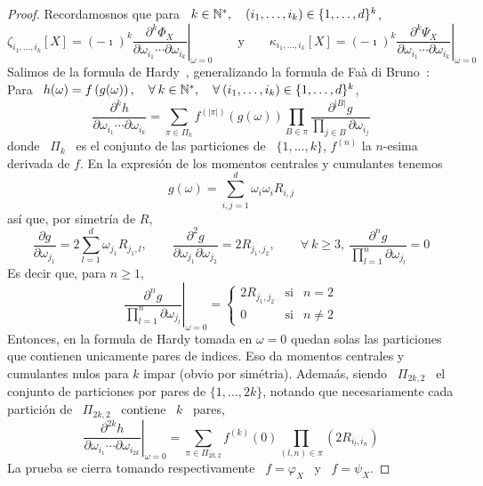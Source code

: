 \begin{proof}
  Recordamosnos que para \ $k \in \mathbb{N}^*, \quad (i_1 , \ldots , i_k) \in \{ 1 ,
  \ldots , d \}^k$,
  \[
  \zeta_{i_1,\ldots,i_k}[X]     =     (-    \imath)^k     \left.\frac{\partial^k
      \Phi_X}{\partial          \omega_{i_1}          \cdots          \partial
      \omega_{i_k}}\right|_{\omega=0}       \qquad       \mbox{y}       \qquad
  \kappa_{i_1,\ldots,i_k}[X]     =    (-     \imath)^k    \left.\frac{\partial^k
      \Psi_X}{\partial          \omega_{i_1}          \cdots          \partial
      \omega_{i_k}}\right|_{\omega=0}
  \]
  Salimos de la formula de Hardy~\cite[Prop.~1]{Har06}, generalizando la formula
  de Fa\`a di  Bruno~\cite{Faa55, Faa57}: Para \ $h(\omega)  = f\left( g(\omega)
  \right), \quad \forall \: k \in \mathbb{N}^*,  \quad \forall \: (i_1 , \ldots , i_k
  ) \in \{ 1 , \ldots , d \}^k$,
  \[
  \frac{\partial^k h}{\partial \omega_{i_1} \cdots  \partial \omega_{i_k}} = \sum_{\pi \in
    \Pi_k}  f^{(|\pi|)}\left( g(\omega)  \right) \prod_{B  \in  \pi} \frac{\partial^{|B|}
    g}{\displaystyle \prod_{j \in B} \partial \omega_{i_j}}
  \]
  donde \ $\Pi_k$ \  es el  conjunto de las  particiones de \ $\{ 1 ,  \ldots ,  k \}$,
  $f^{(n)}$  la $n$-esima derivada  de $f$.  En la  expresi\'on de  los momentos
  centrales y cumulantes tenemos
  \[
  g(\omega) = \sum_{i,j=1}^d \omega_i \omega_i R_{i,j}
  \]
  as\'i que, por simetr\'ia de $R$,
  \[
  \frac{\partial  g}{\partial   \omega_{j_1}}  =  2   \sum_{l=1}^d  \omega_{j_1}
  R_{j_1,l},   \qquad   \frac{\partial^2   g}{\partial   \omega_{j_1}   \partial
    \omega_{j_2}}   =  2   R_{j_1,j_2},  \qquad   \forall   \:  k   \ge  3,   \:
  \frac{\partial^n g}{\prod_{l=1}^n \partial \omega_{j_l}} = 0
  \]
  Es decir que, para $n \ge 1$,
  \[
  \left.     \frac{\partial^n     g}{\prod_{l=1}^n    \partial     \omega_{j_l}}
  \right|_{\omega = 0} = \left\{\begin{array}{ccl}
  2   R_{j_1,j_2} & \mbox{si} & n = 2\\[2mm]
  0 & \mbox{si} & n \ne 2
  \end{array}\right.
  \]
  Entonces,  en la formula  de Hardy  tomada en  $\omega =  0$ quedan  solas las
  particiones  que  contienen  unicamente  pares  de indices.  Eso  da  momentos
  centrales y cumulantes nulos para $k$ impar (obvio por sim\'etria). Adema\'as,
  siendo \  $\Pi_{2 k , 2}$  \ el conjunto de  particiones por pares de  $\{ 1 ,
  \ldots , 2 k \}$, notando que necesariamente cada partici\'on de \ $\Pi_{2 k ,
    2}$ \ contiene \ $k$ \ pares,
  \[
  \left.   \frac{\partial^{2  k}   h}{\partial   \omega_{i_1}  \cdots   \partial
      \omega_{i_{2  k}}}\right|_{\omega =  0} =  \sum_{\pi  \in \Pi_{2  k ,  2}}
  f^{(k)}(0) \prod_{(l,n) \in \pi} \left( 2 R_{i_l,i_n} \right)
  \]
  La prueba  se cierra  tomando respectivamente  \ $f =  \varphi_X$ \  y \  $f =
  \psi_X$.
\end{proof}

